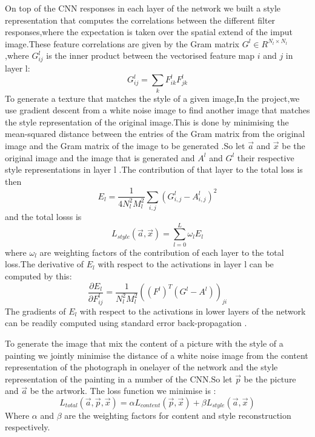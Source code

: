 \documentclass[10pt,a4paper]{article}
\begin{document}
	On top of the CNN responses in each layer of the network we built a style representation that computes the correlations between the different filter responses,where the expectation is taken over the spatial extend of the imput image.These feature correlations are given by the Gram
	matrix $G^l \in R^{N_l\times N_l}$,where $G_{ij}^l$ is the inner product between the vectorised feature map $i$ and $j$ in layer l:
	\begin{equation}
	G_{ij}^{l} = \sum_k F_{ik}^lF_{jk}^l	
	\end{equation}
	To generate a texture that matches the style of a given image,In the project,we use gradient descent from a white noise image to find another image that matches the style representation of the original image.This is
	done by minimising the mean-squared distance between the entries of the Gram matrix from the original image and the Gram matrix of the
	image to be generated .So let $\overrightarrow{a}$ and $\overrightarrow{x}$ be the original image and the image that is generated
	and $A^l$ and $G^l$ their respective style representations in layer l .The
	contribution of that layer to the total loss is then 
	\begin{equation}
	E_l = \dfrac{1}{4N_l^2M_l^2}\sum_{i,j}(G_{i,j}^l - A_{i,j}^l)^2
	\end{equation}
	and the total losss is 
	\begin{equation}
	L_{style}(\overrightarrow{a},\overrightarrow{x})= \sum_{l=0}^{L}\omega_l
	E_l
	\end{equation}
	where $\omega_l$ are weighting factors of the contribution of each layer to the total loss.The derivative of $E_l$ with respect to the activations 
	in layer l can be computed by this:
	\begin{equation}
	\dfrac{\partial E_l}{\partial F_{ij}^l}= \dfrac{1}{N_l^2M_l^2}((F^l)^T(G^l-A^l))_{ji}
	\end{equation}
	The gradients of $E_l$ with respect to the activations in lower layers of the network can be readily computed using standard error back-propagation
	.
	
	To generate the image that mix the content of a picture with the style of a
	painting we jointly minimise the distance of a white noise image from the
	content representation of the photograph in onelayer of the network and the style representation of the painting in a number of the CNN.So let 
	$\overrightarrow{p}$ be the picture and $\overrightarrow{a}$ be the artwork. The loss function we minimise is :
	\begin{equation}
	L_{total}(\overrightarrow{a},\overrightarrow{p},\overrightarrow{x})=\alpha L_{content}(\overrightarrow{p},\overrightarrow{x})+\beta
	L_{style}(\overrightarrow{a},\overrightarrow{x})
	\end{equation}
	Where $\alpha$ and $\beta$ are the weighting factors for content and style reconstruction respectively.
	
	
\end{document}
